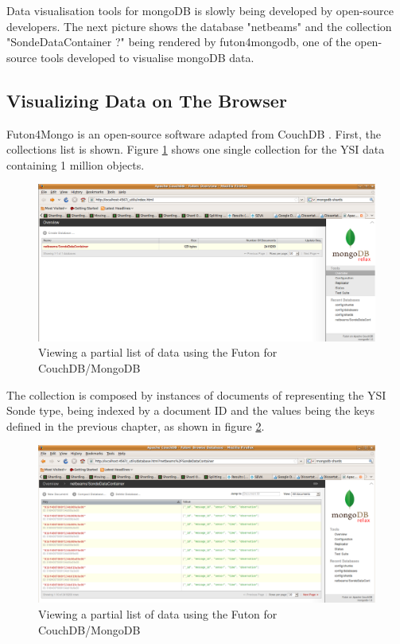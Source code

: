 Data visualisation tools for mongoDB is slowly being developed by open-source
developers. The next picture shows the database "netbeams" and the collection
"SondeDataContainer  ?" being rendered by futon4mongodb, one of the
open-source tools developed to visualise mongoDB data.

\subsection{Visualizing Data on The Browser}

Futon4Mongo is an open-source software adapted from CouchDB \cite{couchdb}.
First, the collections list is shown. Figure
\ref{fig:view-collections-instance-browser-futondb} shows one single collection
for the YSI data containing 1 million objects.

\begin{figure}[h]
  \centering
  \includegraphics[scale=0.45]{../diagrams/view-collections-instance-browser-futondb}
  \caption{Viewing a partial list of data using the Futon for CouchDB/MongoDB}
  \label{fig:view-collections-instance-browser-futondb}
\end{figure}

The collection is composed by instances of documents of representing the YSI
Sonde type, being indexed by a document ID and the values being the keys
defined in the previous chapter, as shown in figure
\ref{fig:view-collected-data-list-browser-futondb}.

\begin{figure}[h]
  \centering
 
  \includegraphics[scale=0.45]{../diagrams/view-collected-data-list-browser-futondb}
  \caption{Viewing a partial list of data using the Futon for CouchDB/MongoDB}
  \label{fig:view-collected-data-list-browser-futondb}
\end{figure}

